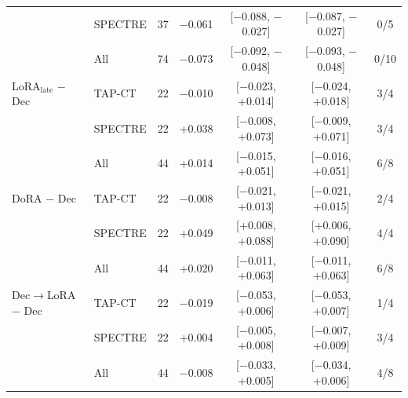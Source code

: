 \begin{tabular}{@{}llrrccc@{}}
 & SPECTRE & 37 & $-$0.061 & [$-$0.088, $-$0.027] & [$-$0.087, $-$0.027] & 0/5 \\
 & All & 74 & $-$0.073 & [$-$0.092, $-$0.048] & [$-$0.093, $-$0.048] & 0/10 \\
\addlinespace[2pt]
LoRA$_{\text{late}}$ $-$ Dec & TAP-CT & 22 & $-$0.010 & [$-$0.023, +0.014] & [$-$0.024, +0.018] & 3/4 \\
 & SPECTRE & 22 & +0.038 & [$-$0.008, +0.073] & [$-$0.009, +0.071] & 3/4 \\
 & All & 44 & +0.014 & [$-$0.015, +0.051] & [$-$0.016, +0.051] & 6/8 \\
\addlinespace[2pt]
DoRA $-$ Dec & TAP-CT & 22 & $-$0.008 & [$-$0.021, +0.013] & [$-$0.021, +0.015] & 2/4 \\
 & SPECTRE & 22 & +0.049 & [+0.008, +0.088] & [+0.006, +0.090] & 4/4 \\
 & All & 44 & +0.020 & [$-$0.011, +0.063] & [$-$0.011, +0.063] & 6/8 \\
\addlinespace[2pt]
Dec$\to$LoRA $-$ Dec & TAP-CT & 22 & $-$0.019 & [$-$0.053, +0.006] & [$-$0.053, +0.007] & 1/4 \\
 & SPECTRE & 22 & +0.004 & [$-$0.005, +0.008] & [$-$0.007, +0.009] & 3/4 \\
 & All & 44 & $-$0.008 & [$-$0.033, +0.005] & [$-$0.034, +0.006] & 4/8 \\
\bottomrule
\end{tabular}
